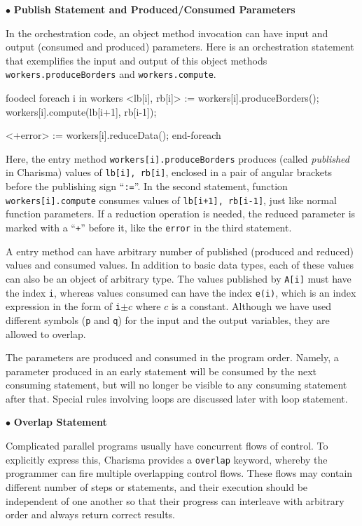\documentclass[10pt]{article}
\def\smallfbox#1{{\small \fbox{#1}}}
\def\code#1{{\small {\tt {#1}}}}
\begin{document}
$\bullet$ {\bf Publish Statement and Produced/Consumed Parameters}

In the orchestration code, an object method invocation can have input and output
(consumed and produced) parameters. Here is an orchestration statement that
exemplifies the input and output of this object methods
\code{workers.produceBorders} and \code{workers.compute}. 

\begin{SaveVerbatim}{foodecl}
  foreach i in workers
    <lb[i], rb[i]> := workers[i].produceBorders();
    workers[i].compute(lb[i+1], rb[i-1]);
    
    <+error> := workers[i].reduceData();
  end-foreach
\end{SaveVerbatim}
\vspace{0.1in}
\smallfbox{\BUseVerbatim{foodecl}}
\vspace{0.1in}

Here, the entry method \code{workers[i].produceBorders} produces (called {\em
published} in Charisma) values of \code{lb[i], rb[i]}, enclosed in a pair of
angular brackets before the publishing sign ``\code{:=}''. In the second
statement, function \code{workers[i].compute} consumes values of \code{lb[i+1],
rb[i-1]}, just like normal function parameters. If a reduction operation is
needed, the reduced parameter is marked with a ``\code{+}'' before it, like the
\code{error} in the third statement. 

A entry method can have arbitrary number of published (produced and reduced)
values and consumed values. In addition to basic data types, each of these
values can also be an object of arbitrary type. The values published by
\code{A[i]} must have the index \code{i}, whereas values consumed can have the
index \code{e(i)}, which is an index expression in the form of \code{i}$\pm c$
where $c$ is a constant. Although we have used different symbols (\code{p} and
\code{q}) for the input and the output variables, they are allowed to overlap. 

The parameters are produced and consumed in the program order. Namely, a
parameter produced in an early statement will be consumed by the next consuming
statement, but will no longer be visible to any consuming statement after that.
Special rules involving loops are discussed later with loop statement.

$\bullet$ {\bf Overlap Statement}

Complicated parallel programs usually have concurrent flows of control. To
explicitly express this, Charisma provides a \code{overlap} keyword, whereby the
programmer can fire multiple overlapping control flows. These flows may contain
different number of steps or statements, and their execution should be
independent of one another so that their progress can interleave with arbitrary
order and always return correct results. 
\end{document}

